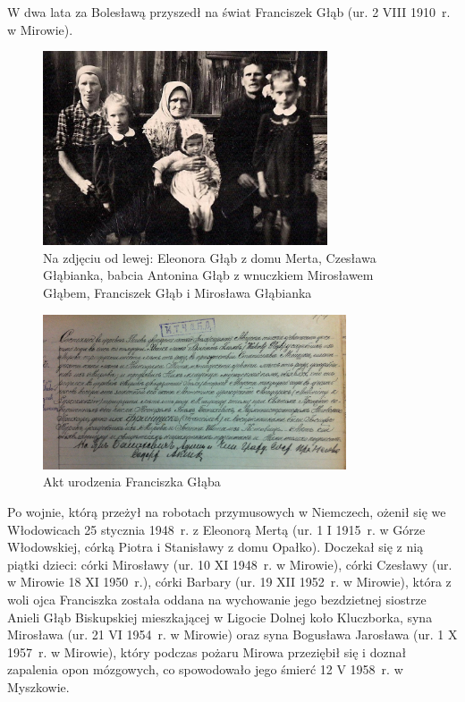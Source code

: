 W dwa lata za Bolesławą przyszedł na świat Franciszek Głąb (ur. 2 VIII 1910~r. w Mirowie).

\begin{figure}[!h]
\begin{center}
\includegraphics[width=0.75\textwidth]{zdjecia/rodzina_eleonory_franciszka_glabow.jpg}
\caption[Rodzina Franciszka i Eleonory Głąbów z babcią Antoniną]{Na zdjęciu od lewej: Eleonora Głąb z domu Merta, Czesława Głąbianka, babcia Antonina Głąb z wnuczkiem Mirosławem Głąbem, Franciszek Głąb i Mirosława Głąbianka}
\label{rys:akt_urodzenia_franciszka_glaba}
\end{center}
\end{figure}

\begin{figure}[!h]
\begin{center}
\includegraphics[width=0.8\textwidth]{zdjecia/akt_urodzenia_franciszka_glaba.jpg}
\caption{Akt urodzenia Franciszka Głąba}
\label{rys:akt_urodzenia_franciszka_glaba}
\end{center}
\end{figure}



Po wojnie, którą przeżył na robotach przymusowych w Niemczech, ożenił się we Włodowicach 25 stycznia 1948~r. z Eleonorą Mertą (ur. 1 I 1915~r. w Górze Włodowskiej, córką Piotra i Stanisławy z domu Opałko). Doczekał się z nią piątki dzieci: córki Mirosławy (ur. 10 XI 1948~r. w Mirowie), córki Czesławy (ur. w Mirowie 18 XI 1950~r.), córki Barbary (ur. 19 XII 1952~r. w Mirowie), która z woli ojca Franciszka została oddana na wychowanie jego bezdzietnej siostrze Anieli Głąb Biskupskiej mieszkającej w Ligocie Dolnej koło Kluczborka, syna Mirosława (ur. 21 VI 1954~r. w Mirowie) oraz syna Bogusława Jarosława (ur. 1 X 1957~r. w Mirowie), który podczas pożaru Mirowa przeziębił się i doznał zapalenia opon mózgowych, co spowodowało jego śmierć 12 V 1958~r. w Myszkowie.





